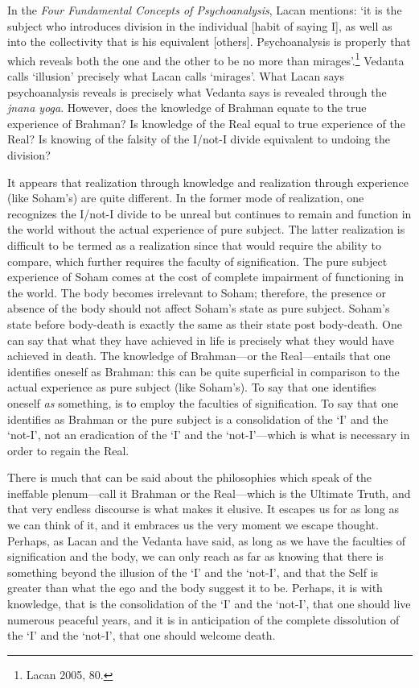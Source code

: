 In the \emph{Four Fundamental Concepts of Psychoanalysis}, Lacan
mentions: `it is the subject who introduces division in the individual
{[}habit of saying I{]}, as well as into the collectivity that is his
equivalent {[}others{]}. Psychoanalysis is properly that which reveals
both the one and the other to be no more than mirages'.\footnote{Lacan 2005, 80.}
Vedanta calls `illusion' precisely what Lacan calls `mirages'. What
Lacan says psychoanalysis reveals is precisely what Vedanta says is
revealed through the \emph{jnana yoga}. However, does the knowledge of
Brahman equate to the true experience of Brahman? Is knowledge of the
Real equal to true experience of the Real? Is knowing of the falsity of
the I/not-I divide equivalent to undoing the division?

It appears that realization through knowledge and realization through
experience (like Soham's) are quite different. In the former mode of
realization, one recognizes the I/not-I divide to be unreal but
continues to remain and function in the world without the actual
experience of pure subject. The latter realization is difficult to be
termed as a realization since that would require the ability to compare,
which further requires the faculty of signification. The pure subject
experience of Soham comes at the cost of complete impairment of
functioning in the world. The body becomes irrelevant to Soham;
therefore, the presence or absence of the body should not affect Soham's
state as pure subject. Soham's state before body-death is exactly the
same as their state post body-death. One can say that what they have
achieved in life is precisely what they would have achieved in death.
The knowledge of Brahman---or the Real---entails that one identifies
oneself as Brahman: this can be quite superficial in comparison to the
actual experience as pure subject (like Soham's). To say that one
identifies oneself \emph{as} something, is to employ the faculties of
signification. To say that one identifies as Brahman or the pure subject
is a consolidation of the `I' and the `not-I', not an eradication of the
`I' and the `not-I'---which is what is necessary in order to regain the
Real.

There is much that can be said about the philosophies which speak of the
ineffable plenum---call it Brahman or the Real---which is the  Ultimate
Truth, and that very endless discourse is what makes it elusive. It
escapes us for as long as we can think of it, and it embraces us the
very moment we escape thought. Perhaps, as Lacan and the Vedanta have
said, as long as we have the faculties of signification and the body, we
can only reach as far as knowing that there is something beyond the
illusion of the `I' and the `not-I', and that the Self is greater than
what the ego and the body suggest it to be. Perhaps, it is with
knowledge, that is the consolidation of the `I' and the `not-I', that
one should live numerous peaceful years, and it is in anticipation of
the complete dissolution of the `I' and the `not-I', that one should
welcome death.

